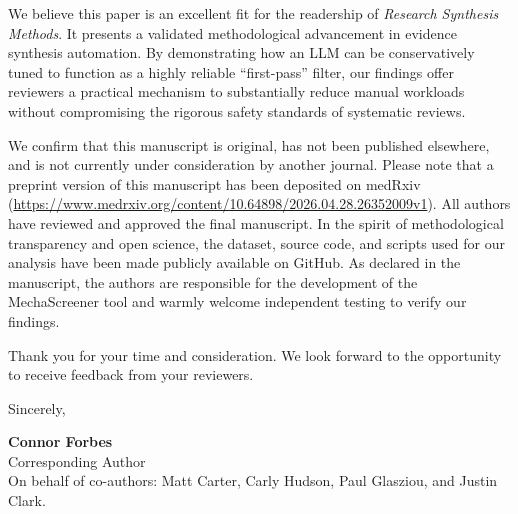 \documentclass[11pt,a4paper]{article}
\begin{document}
We believe this paper is an excellent fit for the readership of \textit{Research Synthesis Methods}. It presents a validated methodological advancement in evidence synthesis automation. By demonstrating how an LLM can be conservatively tuned to function as a highly reliable ``first-pass'' filter, our findings offer reviewers a practical mechanism to substantially reduce manual workloads without compromising the rigorous safety standards of systematic reviews.

We confirm that this manuscript is original, has not been published elsewhere, and is not currently under consideration by another journal. Please note that a preprint version of this manuscript has been deposited on medRxiv (\url{https://www.medrxiv.org/content/10.64898/2026.04.28.26352009v1}). All authors have reviewed and approved the final manuscript. In the spirit of methodological transparency and open science, the dataset, source code, and scripts used for our analysis have been made publicly available on GitHub. As declared in the manuscript, the authors are responsible for the development of the MechaScreener tool and warmly welcome independent testing to verify our findings.

Thank you for your time and consideration. We look forward to the opportunity to receive feedback from your reviewers.

\vspace{2em}

Sincerely,

\vspace{3em}

\textbf{Connor Forbes}\\
Corresponding Author\\
On behalf of co-authors: Matt Carter, Carly Hudson, Paul Glasziou, and Justin Clark.
\end{document}
